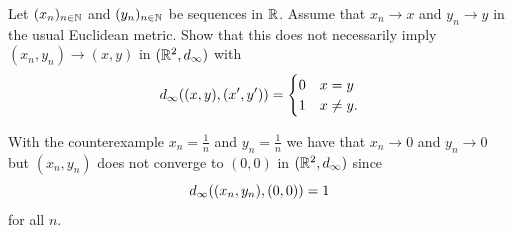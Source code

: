 \begin{exercise}
    \label{ex: incompatible metric}
    Let \((x_n)_{n\in \mathbb{N}}\) and \((y_n)_{n\in \mathbb{N}}\) be sequences in
    \(\mathbb{R}\). Assume that \(x_n \to x\) and \(y_n \to y\) in the usual
    Euclidean metric.
    Show that this does not necessarily imply \((x_n, y_n) \to (x,y)\)
    in \((\mathbb{R}^2, d_\infty)\) with
    \[
        d_\infty((x,y), (x',y'))
        = \begin{cases}
            0 & x=y\\
            1 & x\neq y.
        \end{cases}
    \]
    \begin{solution}
        With the counterexample \(x_n = \frac1n\) and \(y_n = \frac1n\) we have
        that \(x_n \to 0\) and \(y_n \to 0\) but \((x_n, y_n)\) does not
        converge to \((0,0)\) in \((\mathbb{R}^2, d_\infty)\) since
        \[
            d_\infty((x_n, y_n), (0,0)) = 1
        \] for all \(n\).
    \end{solution}
\end{exercise}

